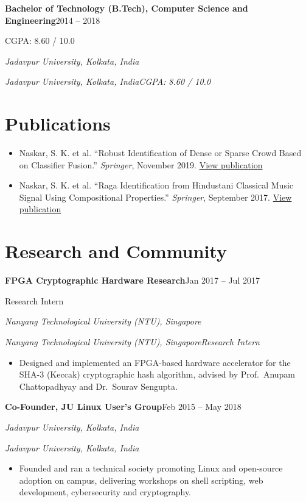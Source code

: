 \documentclass[11pt,a4paper]{article}
\makeatletter
\newcommand{\role}[2]{{\parfillskip=0pt\relax\noindent\textbf{#1}\hfill #2\par}}
\newcommand{\org}[2]{%
  \def\@tmp{#2}%
  \ifx\@tmp\@empty
    {\noindent\textit{#1}\par}%
  \else
    {\parfillskip=0pt\relax\noindent\textit{#1}\hfill\textit{#2}\par}%
  \fi
  \vspace{2pt}}
\makeatother
\begin{document}
\role{Bachelor of Technology (B.Tech), Computer Science and Engineering}{2014 -- 2018}
\org{Jadavpur University, Kolkata, India}{CGPA: 8.60 / 10.0}

\section{Publications}

\begin{itemize}
  \item Naskar, S. K. et al. ``Robust Identification of Dense or Sparse Crowd Based on Classifier
        Fusion.'' \textit{Springer}, November 2019.
        \href{https://rdcu.be/gYz4zQj2Nc2a}{View publication}
  \item Naskar, S. K. et al. ``Raga Identification from Hindustani Classical Music Signal Using
        Compositional Properties.'' \textit{Springer}, September 2017.
        \href{https://www.researchgate.net/publication/320003899_Raga_identification_from_Hindustani_classical_music_signal_using_compositional_properties}{View publication}
\end{itemize}

\section{Research and Community}

\role{FPGA Cryptographic Hardware Research}{Jan 2017 -- Jul 2017}
\org{Nanyang Technological University (NTU), Singapore}{Research Intern}
\begin{itemize}
  \item Designed and implemented an FPGA-based hardware accelerator for the SHA-3 (Keccak)
        cryptographic hash algorithm, advised by Prof.\ Anupam Chattopadhyay and Dr.\ Sourav Sengupta.
\end{itemize}

\role{Co-Founder, JU Linux User's Group}{Feb 2015 -- May 2018}
\org{Jadavpur University, Kolkata, India}{}
\begin{itemize}
  \item Founded and ran a technical society promoting Linux and open-source adoption on campus,
        delivering workshops on shell scripting, web development, cybersecurity and cryptography.
\end{itemize}
\end{document}
